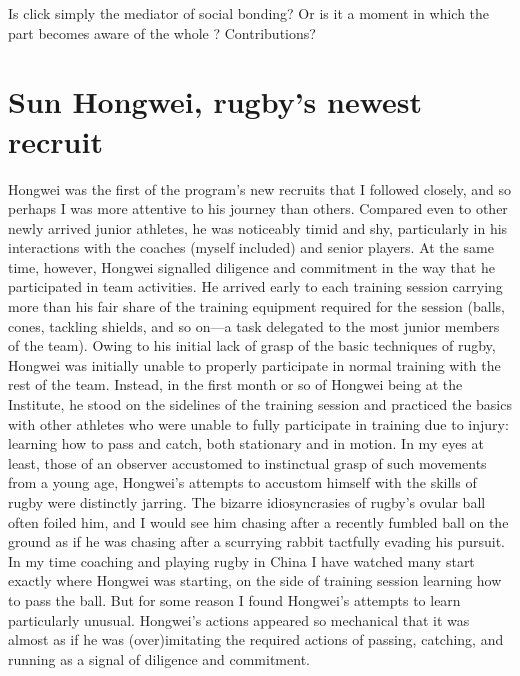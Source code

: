 Is click simply the mediator of social bonding?
Or is it a moment in which the part becomes aware of the whole ?
\citep{}
Contributions?


\section{Sun Hongwei, rugby's newest recruit}
Hongwei was the first of the program’s new recruits that I followed closely, and so perhaps I was more attentive to his journey than others.  Compared even to other newly arrived junior athletes, he was noticeably timid and shy, particularly in his interactions with the coaches (myself included) and senior players.   At the same time, however, Hongwei signalled diligence and commitment in the way that he participated in team activities.  He arrived early to each training session carrying more than his fair share of the training equipment required for the session (balls, cones, tackling shields, and so on---a task delegated to the most junior members of the team). Owing to his initial lack of grasp of the basic techniques of rugby, Hongwei was initially unable to properly participate in normal training with the rest of the team. Instead, in the first month or so of Hongwei being at the Institute, he stood on the sidelines of the training session and practiced the basics with other athletes who were unable to fully participate in training due to injury: learning how to pass and catch, both stationary and in motion. In my eyes at least, those of an observer accustomed to instinctual grasp of such movements from a young age, Hongwei's attempts to accustom himself with the skills of rugby were distinctly jarring.  The bizarre idiosyncrasies of rugby's ovular ball often foiled him, and I would see him chasing after a recently fumbled ball on the ground as if he was chasing after a scurrying rabbit tactfully evading his pursuit.  In my time coaching and playing rugby in China I have watched many start exactly where Hongwei was starting, on the side of training session learning how to pass the ball.  But for some reason I found Hongwei’s attempts to learn particularly unusual.  Hongwei's actions appeared so mechanical that it was almost as if he was (over)imitating the required actions of passing, catching, and running as a signal of diligence and commitment.


